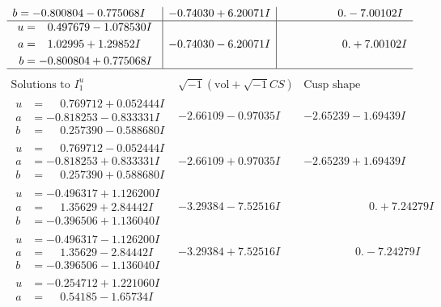 \documentclass[1p]{elsarticle_modified}
\theoremstyle{definition}
\newcommand{\I}{\sqrt{-1}}
\begin{document}
$$\begin{array}{c|c|c}
\begin{aligned}
b &= -0.800804 - 0.775068 I\end{aligned}
 & -0.74030 + 6.20071 I & \phantom{-0.000000 } 0. - 7.00102 I \\ \hline\begin{aligned}
u &= \phantom{-}0.497679 - 1.078530 I \\
a &= \phantom{-}1.02995 + 1.29852 I \\
b &= -0.800804 + 0.775068 I\end{aligned}
 & -0.74030 - 6.20071 I & \phantom{-0.000000 -}0. + 7.00102 I\\
 \hline 
 \end{array}$$\newpage$$\begin{array}{c|c|c}  
\text{Solutions to }I^u_{1}& \I (\text{vol} + \sqrt{-1}CS) & \text{Cusp shape}\\
 \hline 
\begin{aligned}
u &= \phantom{-}0.769712 + 0.052444 I \\
a &= -0.818253 - 0.833331 I \\
b &= \phantom{-}0.257390 - 0.588680 I\end{aligned}
 & -2.66109 - 0.97035 I & -2.65239 - 1.69439 I \\ \hline\begin{aligned}
u &= \phantom{-}0.769712 - 0.052444 I \\
a &= -0.818253 + 0.833331 I \\
b &= \phantom{-}0.257390 + 0.588680 I\end{aligned}
 & -2.66109 + 0.97035 I & -2.65239 + 1.69439 I \\ \hline\begin{aligned}
u &= -0.496317 + 1.126200 I \\
a &= \phantom{-}1.35629 + 2.84442 I \\
b &= -0.396506 + 1.136040 I\end{aligned}
 & -3.29384 - 7.52516 I & \phantom{-0.000000 -}0. + 7.24279 I \\ \hline\begin{aligned}
u &= -0.496317 - 1.126200 I \\
a &= \phantom{-}1.35629 - 2.84442 I \\
b &= -0.396506 - 1.136040 I\end{aligned}
 & -3.29384 + 7.52516 I & \phantom{-0.000000 } 0. - 7.24279 I \\ \hline\begin{aligned}
u &= -0.254712 + 1.221060 I \\
a &= \phantom{-}0.54185 - 1.65734 I \\

\end{aligned}
\end{array}$$
\end{document}
